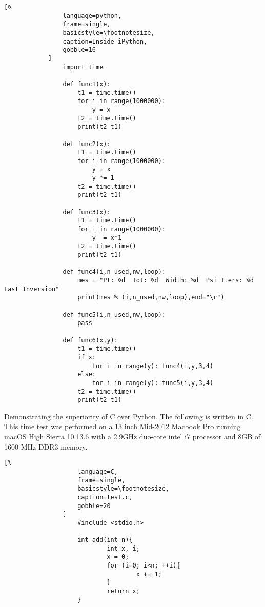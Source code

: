 \documentclass[crop=false,class=article,oneside]{standalone}
\begin{document}
            \begin{lstlisting}[%
                language=python,
                frame=single,
                basicstyle=\footnotesize,
                caption=Inside iPython,
                gobble=16
            ]
                import time
                
                def func1(x):
                	t1 = time.time()
                	for i in range(1000000):
                		y = x
                	t2 = time.time()
                	print(t2-t1)
                
                def func2(x):
                	t1 = time.time()
                	for i in range(1000000):
                		y = x
                		y *= 1
                	t2 = time.time()
                	print(t2-t1)
                
                def func3(x):
                    t1 = time.time()
                    for i in range(1000000):
                        y  = x*1
                    t2 = time.time()
                    print(t2-t1)
                
                def func4(i,n_used,nw,loop):
                    mes = "Pt: %d  Tot: %d  Width: %d  Psi Iters: %d  Fast Inversion"
                    print(mes % (i,n_used,nw,loop),end="\r")
                
                def func5(i,n_used,nw,loop):
                	pass
                
                def func6(x,y):
                	t1 = time.time()
                	if x:
                		for i in range(y): func4(i,y,3,4)
                	else:
                		for i in range(y): func5(i,y,3,4)
                	t2 = time.time()
                	print(t2-t1)
            \end{lstlisting}
            Demonstrating the superiority of C over Python.
            The following is written in C. This time test was
            performed on a 13 inch Mid-2012 Macbook Pro running macOS
            High Sierra 10.13.6 with a 2.9GHz duo-core intel i7
            processor and 8GB of 1600 MHz DDR3 memory.
            \newpage
            \begin{minipage}[t]{.48\textwidth}
                \centering
                \begin{lstlisting}[%
                    language=C,
                    frame=single,
                    basicstyle=\footnotesize,
                    caption=test.c,
                    gobble=20
                ]
                    #include <stdio.h>
                    
                    int add(int n){
                            int x, i;
                            x = 0;
                            for (i=0; i<n; ++i){
                                    x += 1;
                            }
                            return x;
                    }
                \end{lstlisting}
            \end{minipage}\hfill
\end{document}
